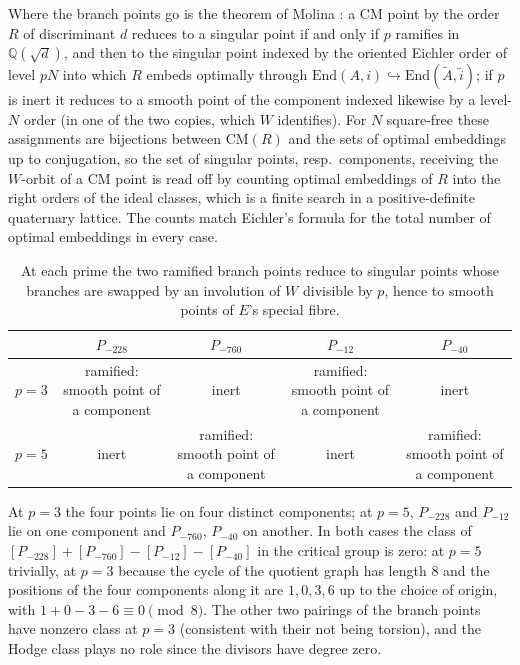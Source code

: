 \documentclass[11pt,reqno]{amsart}
\theoremstyle{plain}
\theoremstyle{definition}
\newcommand{\Q}{\mathbb{Q}}
\begin{document}
Where the branch points go is the theorem of Molina \cite[Theorems 5.3, 5.4, 5.8]{molina}: a CM point by
the order $R$ of discriminant $d$ reduces to a singular point if and only if $p$ ramifies in $\Q(\sqrt d)$,
and then to the singular point indexed by the oriented Eichler order of level $pN$ into which $R$ embeds
optimally through $\mathrm{End}(A,i)\hookrightarrow\mathrm{End}(\tilde A,\tilde i)$; if $p$ is inert it
reduces to a smooth point of the component indexed likewise by a level-$N$ order (in one of the two copies,
which $W$ identifies). For $N$ square-free these assignments are bijections between $\mathrm{CM}(R)$ and the
sets of optimal embeddings up to conjugation, so the set of singular points, resp.\ components, receiving the
$W$-orbit of a CM point is read off by counting optimal embeddings of $R$ into the right orders of the
ideal classes, which is a finite search in a positive-definite quaternary lattice. The counts match
Eichler's formula for the total number of optimal embeddings in every case.

\begin{table}[h]
\centering
\begin{tabular}{lcccc}
\toprule
 & $P_{-228}$ & $P_{-760}$ & $P_{-12}$ & $P_{-40}$\\
\midrule
$p=3$ & ramified: smooth point of a component & inert & ramified: smooth point of a component & inert\\
$p=5$ & inert & ramified: smooth point of a component & inert & ramified: smooth point of a component\\
\bottomrule
\end{tabular}
\caption{At each prime the two ramified branch points reduce to singular points whose branches are swapped
by an involution of $W$ divisible by $p$, hence to smooth points of $E$'s special fibre.}
\end{table}

At $p=3$ the four points lie on four distinct components; at $p=5$, $P_{-228}$ and $P_{-12}$ lie on one
component and $P_{-760}$, $P_{-40}$ on another. In both cases the class of
$[P_{-228}]+[P_{-760}]-[P_{-12}]-[P_{-40}]$ in the critical group is zero: at $p=5$ trivially, at $p=3$
because the cycle of the quotient graph has length $8$ and the positions of the four components along it
are $1,0,3,6$ up to the choice of origin, with $1+0-3-6\equiv0\pmod 8$. The other two pairings of the branch
points have nonzero class at $p=3$ (consistent with their not being torsion), and the Hodge class plays no
role since the divisors have degree zero.
\end{document}
